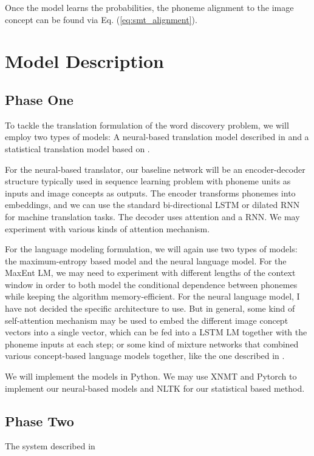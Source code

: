 \documentclass[a4paper]{article}
\begin{document}
Once the model learns the probabilities, the phoneme alignment to the image concept can be found via Eq. (\ref{eq:smt_alignment}).

\section{Model Description}
\subsection{Phase One}
To tackle the translation formulation of the word discovery problem, we will employ two types of models: A neural-based translation model described in \cite{Bahdanau14} and a statistical translation model based on \cite{Brown93}. 

For the neural-based translator, our baseline network will be an encoder-decoder structure typically used
in sequence learning problem with phoneme units as inputs and image concepts as outputs. The encoder transforms phonemes into embeddings, and we can use the standard bi-directional LSTM or dilated RNN for machine translation tasks. The decoder uses attention and a RNN. We may experiment with various kinds of attention mechanism.

For the language modeling formulation, we will again use two types of models: the maximum-entropy based model and the neural language model. For the MaxEnt LM, we may need to experiment with different lengths of the context window in order to both model the conditional dependence between phonemes while keeping the algorithm memory-efficient. For the neural language model, I have not decided the specific architecture to use.
But in general, some kind of self-attention mechanism may be used to embed the different image concept vectors into a single vector, which can be fed into a LSTM LM together with the phoneme inputs at each step; or some kind of mixture networks that combined various concept-based language models together, like the one described in \cite{Kalai99}.

We will implement the models in Python. We may use XNMT and Pytorch to implement our neural-based models and NLTK for our statistical based method.

\subsection{Phase Two}
The system described in 
\end{document}
